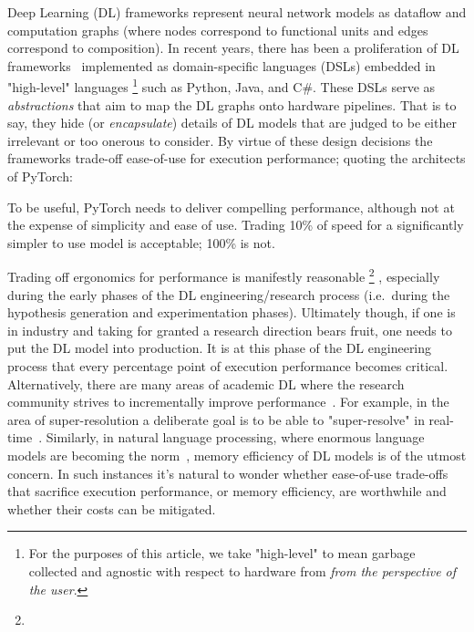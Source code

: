 \documentclass[sigconf]{acmart}
\begin{document}
Deep Learning (DL) frameworks represent neural network models as dataflow and computation graphs (where nodes correspond to functional units and edges correspond to composition).
In recent years, there has been a proliferation of DL frameworks~\cite{paszke2019pytorch,abadi2016tensorflow,chen2015mxnet,cntk} implemented as domain-specific languages (DSLs) embedded in "high-level" languages%
\footnote{For the purposes of this article, we take "high-level" to mean garbage collected and agnostic with respect to hardware from \textit{from the perspective of the user}.} such as Python, Java, and C\#.
These DSLs serve as \textit{abstractions} that aim to map the DL graphs onto hardware pipelines.
That is to say, they hide (or \textit{encapsulate}) details of DL models that are judged to be either irrelevant or too onerous to consider.
By virtue of these design decisions the frameworks trade-off ease-of-use for execution performance;
quoting the architects of PyTorch:
\begin{displayquote}
  To be useful, PyTorch needs to deliver compelling performance, although not at the expense of simplicity and ease of use.
  Trading 10\% of speed for a significantly simpler to use model is acceptable; 100\% is not.
\end{displayquote}

Trading off ergonomics for performance is manifestly reasonable%
\footnote{}%
, especially during the early phases of the DL engineering/research process (i.e.\ during the hypothesis generation and experimentation phases).
Ultimately though, if one is in industry and taking for granted a research direction bears fruit, one needs to put the DL model into production.
It is at this phase of the DL engineering process that every percentage point of execution performance becomes critical.
Alternatively, there are many areas of academic DL where the research community strives to incrementally improve performance~\cite{abdelhamed2020ntire,hall2020probability,ILSVRC15}.
For example, in the area of super-resolution a deliberate goal is to be able to "super-resolve" in real-time~\cite{7780576}.
Similarly, in natural language processing, where enormous language models are becoming the norm~\cite{brown2020language}, memory efficiency of DL models is of the utmost concern.
In such instances it's natural to wonder whether ease-of-use trade-offs that sacrifice execution performance, or memory efficiency, are worthwhile and whether their costs can be mitigated.
\end{document}
